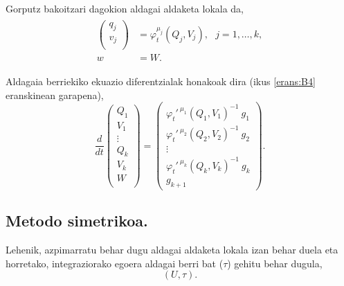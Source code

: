 Gorputz bakoitzari dagokion aldagai aldaketa lokala da,
\begin{align}
\label{eq:aldfl2}
\begin{split}
\left(\begin{array}{c}
                q_j  \\
                v_j  \\
\end{array}\right)&= \varphi_t^{\mu_j}(Q_j,V_j), \ \ \ j=1,\dots,k, \\
w&=W.
\end{split}
\end{align}

Aldagaia berriekiko ekuazio diferentzialak honakoak dira (ikus \ref{erans:B4} eranskinean garapena),
\begin{equation*}
\frac{d}{dt}
\left(\begin{array}{c}
                Q_1  \\
                V_1  \\
                \vdots \\
                Q_k    \\
                V_k    \\
                W      \\
\end{array}\right)=
\left(\begin{array}{c}
               \varphi_t'^{\ \mu_1}(Q_1,V_1)^{-1} \ g_1 \\ 
               \varphi_t'^{\ \mu_2}(Q_2,V_2)^{-1} \ g_2 \\
               \vdots \\
               \varphi_t'^{\ \mu_k}(Q_k,V_k)^{-1} \ g_k \\
               g_{k+1}
\end{array}\right).
\end{equation*}



\subsection*{Metodo simetrikoa.}

Lehenik, azpimarratu behar dugu aldagai aldaketa lokala izan behar duela eta horretako, integraziorako egoera aldagai berri bat ($\tau$) gehitu behar dugula,
\begin{equation}
(U,\tau).
\end{equation}

